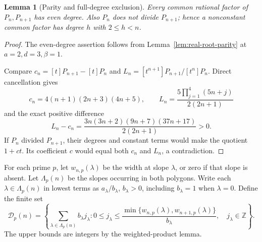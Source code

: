 \documentclass[11pt]{article}
\newtheorem{lemma}[theorem]{Lemma}
\begin{document}
\begin{lemma}[Parity and full-degree exclusion]\label{lem:quintic-even-common-degree}
Every common rational factor of $P_n,P_{n+1}$ has even degree.
Also $P_n$ does not divide $P_{n+1}$; hence a nonconstant common
factor has degree $h$ with $2\le h<n$.
\end{lemma}
\begin{proof}
The even-degree assertion follows from
Lemma~\ref{lem:real-root-parity} at $a=2,d=3,\beta=1$.

Compare $c_n=[t]P_{n+1}-[t]P_n$ and
$L_n=[t^{n+1}]P_{n+1}/[t^n]P_n$. Direct cancellation gives
\[
 c_n=4(n+1)(2n+3)(4n+5),\qquad
 L_n=\frac{5\prod_{j=1}^4(5n+j)}{2(2n+1)}
\]
and the exact positive difference
\[
 L_n-c_n=
 \frac{3n(3n+2)(9n+7)(37n+17)}{2(2n+1)}>0.
\]
If $P_n$ divided $P_{n+1}$, their degrees and constant terms would
make the quotient $1+ct$. Its coefficient $c$ would equal
both $c_n$ and $L_n$, a contradiction.
\end{proof}

For each prime $p$, let $w_{n,p}(\lambda)$ be the width at slope
$\lambda$, or zero if that slope is absent.
Let $\Lambda_p(n)$ be the slopes occurring in both polygons.
Write each $\lambda\in\Lambda_p(n)$ in lowest terms as
$a_\lambda/b_\lambda$, $b_\lambda>0$, including $b_\lambda=1$
when $\lambda=0$. Define the finite set
\[
 {\mathcal D}_p(n)=
 \left\{\sum_{\lambda\in\Lambda_p(n)}b_\lambda j_\lambda:
 0\le j_\lambda\le
 \frac{\min\{w_{n,p}(\lambda),w_{n+1,p}(\lambda)\}}{b_\lambda},
 \quad j_\lambda\in\mathbb Z\right\}.                         \tag{D1}
\]
The upper bounds are integers by the weighted-product lemma.
\end{document}
